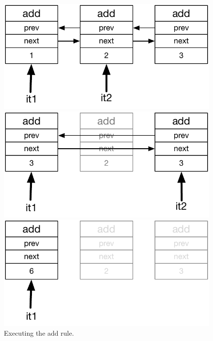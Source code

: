 \begin{figure}
\centering
\begin{minipage}{.40\textwidth}
  \centering
  \includegraphics[width=.9\linewidth]{figures/update}
\end{minipage}%
\begin{minipage}{.40\textwidth}
  \centering
  \includegraphics[width=0.9\linewidth]{figures/update2}
\end{minipage}
\begin{minipage}{.40\textwidth}
   \centering
  \includegraphics[width=0.9\linewidth]{figures/update3}
\end{minipage}
\caption{Executing the add rule.}
\label{fig:update_add}
\end{figure}

